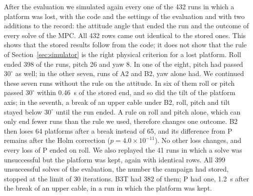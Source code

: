 \documentclass{interact}
\begin{document}
After the evaluation we simulated again every one of the 432 runs in which a platform was lost, with the code and the settings of the evaluation and with two additions to the record: the attitude angle that ended the run and the outcome of every solve of the MPC. All 432 rows came out identical to the stored ones. This shows that the stored results follow from the code; it does not show that the rule of Section~\ref{sec:simulator} is the right physical criterion for a lost platform. Roll ended 398 of the runs, pitch 26 and yaw 8. In one of the eight, pitch had passed $30^\circ$ as well; in the other seven, runs of A2 and B2, yaw alone had. We continued these seven runs without the rule on the attitude. In six of them roll or pitch passed $30^\circ$ within 0.46~s of the stored end, and so did the tilt of the platform axis; in the seventh, a break of an upper cable under B2, roll, pitch and tilt stayed below $30^\circ$ until the run ended. A rule on roll and pitch alone, which can only end fewer runs than the rule we used, therefore changes one outcome. B2 then loses 64 platforms after a break instead of 65, and its difference from P remains after the Holm correction ($p=4.0\times10^{-11}$). No other loss changes, and every loss of P ended on roll. We also replayed the 41 runs in which a solve was unsuccessful but the platform was kept, again with identical rows. All 399 unsuccessful solves of the evaluation, the number the campaign had stored, stopped at the limit of 30 iterations. B3T had 382 of them; P had one, 1.2~s after the break of an upper cable, in a run in which the platform was kept.
\end{document}
